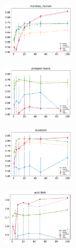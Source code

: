 \begin{subfigure}                                                                        
     \centering                                                                          
         \includegraphics[width=0.32\textwidth]{fig/moreno_names__entropy@_roc_evo}
\end{subfigure}
\begin{subfigure}
         \centering
      \includegraphics[width=0.32\textwidth]{fig/prosper-loans__entropy@_roc_evo}
\end{subfigure}                                                             
\begin{subfigure}                                                           
         \centering                                                         
      \includegraphics[width=0.32\textwidth]{fig/slashdot__entropy@_roc_evo}
\end{subfigure}                                                             
\begin{subfigure}                                                           
         \centering                                                         
      \includegraphics[width=0.32\textwidth]{fig/wiki-link__entropy@_roc_evo}
\end{subfigure}                                                             
